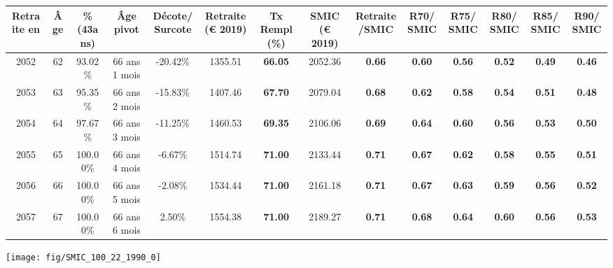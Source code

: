 \begin{adjustbox}{max width=\textwidth} 
\begin{tabular}[htb]{|c|c||c|c|c||c|c||c|c||c|c|c|c|c|} 
\hline 
 Retraite en &  Âge &  \%(43ans) &  Âge pivot &  Décote/Surcote &  Retraite (\euro{} 2019) &  Tx Rempl(\%) &  SMIC (\euro{} 2019) &  Retraite/SMIC &  R70/SMIC &  R75/SMIC &  R80/SMIC &  R85/SMIC &  R90/SMIC \\ 
\hline \hline 
 2052 &  62 &  93.02\% &  66 ans 1 mois &  -20.42\% &  1355.51 &  {\bf 66.05} &  2052.36 &  {\bf {\color{red} 0.66}} &  {\bf {\color{red} 0.60}} &  {\bf {\color{red} 0.56}} &  {\bf {\color{red} 0.52}} &  {\bf {\color{red} 0.49}} &  {\bf {\color{red} 0.46}} \\ 
\hline 
 2053 &  63 &  95.35\% &  66 ans 2 mois &  -15.83\% &  1407.46 &  {\bf 67.70} &  2079.04 &  {\bf {\color{red} 0.68}} &  {\bf {\color{red} 0.62}} &  {\bf {\color{red} 0.58}} &  {\bf {\color{red} 0.54}} &  {\bf {\color{red} 0.51}} &  {\bf {\color{red} 0.48}} \\ 
\hline 
 2054 &  64 &  97.67\% &  66 ans 3 mois &  -11.25\% &  1460.53 &  {\bf 69.35} &  2106.06 &  {\bf {\color{red} 0.69}} &  {\bf {\color{red} 0.64}} &  {\bf {\color{red} 0.60}} &  {\bf {\color{red} 0.56}} &  {\bf {\color{red} 0.53}} &  {\bf {\color{red} 0.50}} \\ 
\hline 
 2055 &  65 &  100.00\% &  66 ans 4 mois &  -6.67\% &  1514.74 &  {\bf 71.00} &  2133.44 &  {\bf {\color{red} 0.71}} &  {\bf {\color{red} 0.67}} &  {\bf {\color{red} 0.62}} &  {\bf {\color{red} 0.58}} &  {\bf {\color{red} 0.55}} &  {\bf {\color{red} 0.51}} \\ 
\hline 
 2056 &  66 &  100.00\% &  66 ans 5 mois &  -2.08\% &  1534.44 &  {\bf 71.00} &  2161.18 &  {\bf {\color{red} 0.71}} &  {\bf {\color{red} 0.67}} &  {\bf {\color{red} 0.63}} &  {\bf {\color{red} 0.59}} &  {\bf {\color{red} 0.56}} &  {\bf {\color{red} 0.52}} \\ 
\hline 
 2057 &  67 &  100.00\% &  66 ans 6 mois &  2.50\% &  1554.38 &  {\bf 71.00} &  2189.27 &  {\bf {\color{red} 0.71}} &  {\bf {\color{red} 0.68}} &  {\bf {\color{red} 0.64}} &  {\bf {\color{red} 0.60}} &  {\bf {\color{red} 0.56}} &  {\bf {\color{red} 0.53}} \\ 
\hline 
\hline 
\end{tabular} 
\end{adjustbox} 
 
 \vspace{0.1cm} 

 {\hspace{-2.2cm}\texttt{[image: fig/SMIC\_100\_22\_1990\_0]}} 

